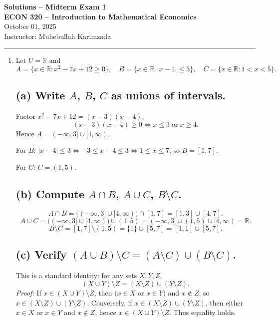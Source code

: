 \documentclass[12pt]{article}
\begin{document}
\begin{center}
{\Large \textbf{Solutions -- Midterm Exam 1}} \\[0.9em]
\textbf{ECON 320 -- Introduction to Mathematical Economics} \\[0.7em]

October 01, 2025
 \\[0.8em]
Instructor: Muhebullah Karimzada
\end{center}

\hrule
\begin{enumerate}



\item Let $U=\mathbb{R}$ and
\[
A=\{x\in\mathbb{R}: x^2-7x+12\ge 0\}, \quad
B=\{x\in\mathbb{R}: |x-4|\le 3\}, \quad
C=\{x\in\mathbb{R}: 1<x<5\}.
\]

\subsection*{(a) Write $A$, $B$, $C$ as unions of intervals.}
Factor $x^2-7x+12=(x-3)(x-4)$.
\[
(x-3)(x-4)\ge 0 \iff x\le 3 \;\text{or}\; x\ge 4.
\]
Hence $A=(-\infty,3]\cup[4,\infty)$.

For $B$: $|x-4|\le 3 \iff -3\le x-4\le 3 \iff 1\le x\le 7$, so $B=[1,7]$.

For $C$: $C=(1,5)$.

\subsection*{(b) Compute $A\cap B$, $A\cup C$, $B\setminus C$.}
\[
A\cap B = \big((-\infty,3]\cup[4,\infty)\big)\cap[1,7]
= [1,3]\cup[4,7].
\]
\[
A\cup C = \big((-\infty,3]\cup[4,\infty)\big)\cup(1,5)
= (-\infty,3]\cup(1,5)\cup[4,\infty)=\mathbb{R}.
\]
\[
B\setminus C = [1,7]\setminus(1,5)=\{1\}\cup[5,7]=[1,1]\cup[5,7].
\]

\subsection*{(c) Verify $(A\cup B)\setminus C=(A\setminus C)\cup(B\setminus C)$.}
This is a standard identity: for any sets $X,Y,Z$,
\[
(X\cup Y)\setminus Z = (X\setminus Z)\cup(Y\setminus Z).
\]
\emph{Proof:} If $x\in (X\cup Y)\setminus Z$, then $(x\in X$ or $x\in Y)$ and $x\notin Z$, so $x\in(X\setminus Z)\cup(Y\setminus Z)$.
Conversely, if $x\in(X\setminus Z)\cup(Y\setminus Z)$, then either $x\in X$ or $x\in Y$ and $x\notin Z$, hence $x\in (X\cup Y)\setminus Z$.
Thus equality holds. 


\end{enumerate}
\end{document}
